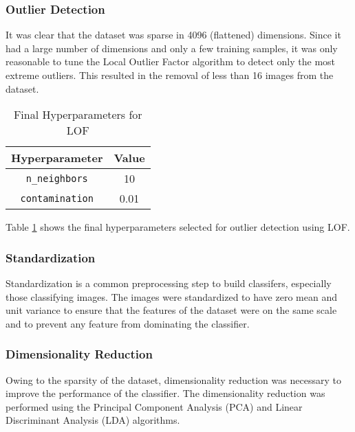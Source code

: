 \documentclass[conference]{IEEEtran}
\begin{document}
    \subsubsection{Outlier Detection}
    \label{sec:outlierdetection}
    It was clear that the dataset was sparse in 4096 (flattened) dimensions.
    Since it had a large number of dimensions and only a few training samples, it was only reasonable to tune the
    Local Outlier Factor algorithm to detect only the most extreme outliers.
    This resulted in the removal of less than 16 images from the dataset.

    \begin{table}[htbp]
        \caption{Final Hyperparameters for LOF}
        \begin{center}
            \begin{tabular}{|c|c|}
                \hline
                \textbf{Hyperparameter} & \textbf{Value} \\
                \hline
                \texttt{n\_neighbors} & 10 \\
                \hline
                \texttt{contamination} & 0.01 \\
                \hline
            \end{tabular}
            \label{tab:lof}
        \end{center}
    \end{table}

    Table \ref{tab:lof} shows the final hyperparameters selected for outlier detection using LOF.

    \subsubsection{Standardization}
    \label{sec:standardization}
    Standardization is a common preprocessing step to build classifers, especially those classifying images.
    The images were standardized to have zero mean and unit variance to ensure that the features of the
    dataset were on the same scale and to prevent any feature from dominating the classifier.

    \subsubsection{Dimensionality Reduction}
    \label{sec:dimreduction}
    Owing to the sparsity of the dataset, dimensionality reduction was necessary to improve the performance of the classifier.
    The dimensionality reduction was performed using the Principal Component Analysis (PCA) and Linear Discriminant Analysis (LDA) algorithms.
\end{document}
